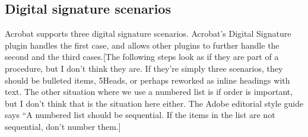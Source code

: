 \documentclass[letterpaper,12pt,english,openany,oneside]{sphinxmanual}
\begin{document}
\subsection{Digital signature scenarios}
\label{\detokenize{Plugins_ExtendedAPI:digital-signature-scenarios}}
Acrobat supports three digital signature scenarios. Acrobat’s Digital Signature plugin handles the first case, and allows other plugins to further handle the second and the third cases.{[}The following steps look as if they are part of a procedure, but I don’t think they are. If they’re simply three scenarios, they should be bulleted items, 5Heads, or perhaps reworked as inline headings with text. The other situation where we use a numbered list is if order is important, but I don’t think that is the situation here either. The Adobe editorial style guide says “A numbered list should be sequential. If the items in the list are not sequential, don’t number them.{]}
\end{document}
